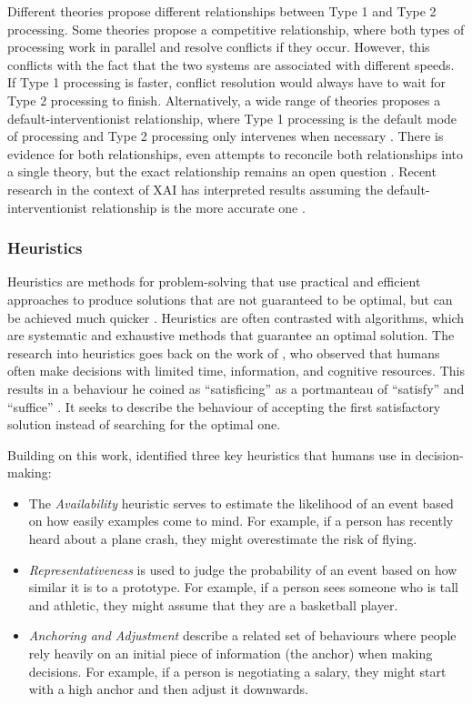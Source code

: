 Different theories propose different relationships between Type 1 and Type 2 processing. Some theories propose a competitive relationship, where both types of processing work in parallel and resolve conflicts if they occur. However, this conflicts with the fact that the two systems are associated with different speeds. If Type 1 processing is faster, conflict resolution would always have to wait for Type 2 processing to finish. Alternatively, a wide range of theories proposes a default-interventionist relationship, where Type 1 processing is the default mode of processing and Type 2 processing only intervenes when necessary \parencite{Evans2013}. There is evidence for both relationships, even attempts to reconcile both relationships into a single theory, but the exact relationship remains an open question \parencite{Evans2013, Djulbegovic2012}. Recent research in the context of \ac{XAI} has interpreted results assuming the default-interventionist relationship is the more accurate one \parencite{Jussupow2021, Shin2021}.

\subsubsection{Heuristics} \label{sssec:heuristics}

Heuristics are methods for problem-solving that use practical and efficient approaches to produce solutions that are not guaranteed to be optimal, but can be achieved much quicker \parencite{Gigerenzer2011}. Heuristics are often contrasted with algorithms, which are systematic and exhaustive methods that guarantee an optimal solution. The research into heuristics goes back on the work of \cite{Simon1955}, who observed that humans often make decisions with limited time, information, and cognitive resources. This results in a behaviour he coined as “satisficing” as a portmanteau of “satisfy” and “suffice” \parencite{Simon1956}. It seeks to describe the behaviour of accepting the first satisfactory solution instead of searching for the optimal one.

Building on this work, \textcite{Tversky1974} identified three key heuristics that humans use in decision-making:

\begin{itemize}
    \item The \textit{Availability} heuristic serves to estimate the likelihood of an event based on how easily examples come to mind. For example, if a person has recently heard about a plane crash, they might overestimate the risk of flying.
    \item \textit{Representativeness} is used to judge the probability of an event based on how similar it is to a prototype. For example, if a person sees someone who is tall and athletic, they might assume that they are a basketball player.
    \item \textit{Anchoring and Adjustment} describe a related set of behaviours where people rely heavily on an initial piece of information (the anchor) when making decisions. For example, if a person is negotiating a salary, they might start with a high anchor and then adjust it downwards.
\end{itemize}

